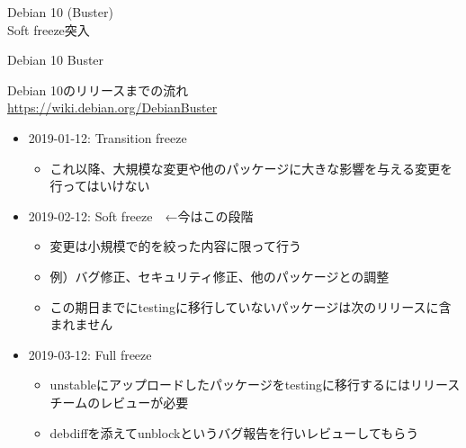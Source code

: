 \begin{frame}
  \begin{center}\Huge{Debian 10 (Buster)\\Soft freeze突入}\end{center}
\end{frame}


\begin{frame}{Debian 10 Buster}%

Debian 10のリリースまでの流れ \\
\url{https://wiki.debian.org/DebianBuster}
  
\begin{itemize}
\item 2019-01-12: Transition freeze
  \begin{itemize}
  \item これ以降、大規模な変更や他のパッケージに大きな影響を与える変更を行ってはいけない
  \end{itemize}
\item 2019-02-12: Soft freeze　←今はこの段階
  \begin{itemize}
  \item 変更は小規模で的を絞った内容に限って行う
  \item 例）バグ修正、セキュリティ修正、他のパッケージとの調整
  \item この期日までにtestingに移行していないパッケージは次のリリースに含まれません
  \end{itemize}
\item 2019-03-12: Full freeze
  \begin{itemize}
  \item unstableにアップロードしたパッケージをtestingに移行するにはリリースチームのレビューが必要
  \item debdiffを添えてunblockというバグ報告を行いレビューしてもらう
  \end{itemize}
\end{itemize}
\end{frame}


